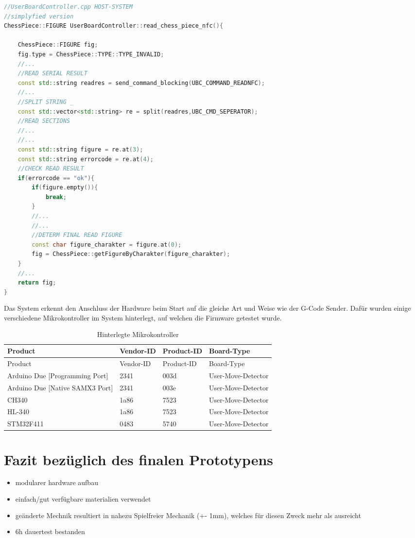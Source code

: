 \begin{lstlisting}[language={C++}]
//UserBoardController.cpp HOST-SYSTEM
//simplyfied version
ChessPiece::FIGURE UserBoardController::read_chess_piece_nfc(){

    ChessPiece::FIGURE fig;
    fig.type = ChessPiece::TYPE::TYPE_INVALID;
    //...
    //READ SERIAL RESULT
    const std::string readres = send_command_blocking(UBC_COMMAND_READNFC);
    //...
    //SPLIT STRING _
    const std::vector<std::string> re = split(readres,UBC_CMD_SEPERATOR);
    //READ SECTIONS
    //...
    //...
    const std::string figure = re.at(3);
    const std::string errorcode = re.at(4);
    //CHECK READ RESULT
    if(errorcode == "ok"){
        if(figure.empty()){
            break;
        }
        //...
        //...
        //DETERM FINAL READ FIGURE
        const char figure_charakter = figure.at(0);
        fig = ChessPiece::getFigureByCharakter(figure_charakter);
    }
    //...
    return fig;
}
\end{lstlisting}

Das System erkennt den Anschluss der Hardware beim Start auf die gleiche
Art und Weise wie der G-Code Sender. Dafür wurden einige verschiedene
Mikrokontroller im System hinterlegt, auf welchen die Firmware getestet
wurde.

\begin{longtable}[]{@{}llll@{}}
\caption{Hinterlegte Mikrokontroller}\tabularnewline
\toprule
Product & Vendor-ID & Product-ID & Board-Type\tabularnewline
\midrule
\endfirsthead
\toprule
Product & Vendor-ID & Product-ID & Board-Type\tabularnewline
\midrule
\endhead
Arduino Due {[}Programming Port{]} & 2341 & 003d &
User-Move-Detector\tabularnewline
Arduino Due {[}Native SAMX3 Port{]} & 2341 & 003e &
User-Move-Detector\tabularnewline
CH340 & 1a86 & 7523 & User-Move-Detector\tabularnewline
HL-340 & 1a86 & 7523 & User-Move-Detector\tabularnewline
STM32F411 & 0483 & 5740 & User-Move-Detector\tabularnewline
\bottomrule
\end{longtable}

\hypertarget{fazit-bezuxfcglich-des-finalen-prototypens}{%
\section{Fazit bezüglich des finalen
Prototypens}\label{fazit-bezuxfcglich-des-finalen-prototypens}}

\begin{itemize}
\tightlist
\item
  modularer hardware aufbau
\item
  einfach/gut verfügbare materialien verwendet
\item
  geänderte Mechnik resultiert in nahezu Spielfreier Mechanik (+- 1mm),
  welches für diesen Zweck mehr als ausreicht
\item
  6h dauertest bestanden
\end{itemize}


